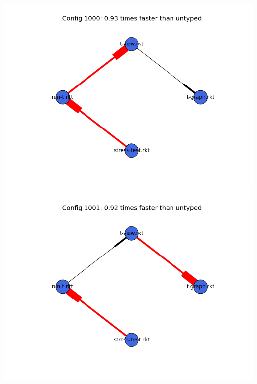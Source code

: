 \documentclass{article}
\begin{document}
\begin{itemize}
\includegraphics[width=\textwidth]{mbta-2015-03-26-module-graph-1000.png}
\includegraphics[width=\textwidth]{mbta-2015-03-26-module-graph-1001.png}
\end{itemize}
\end{document}
